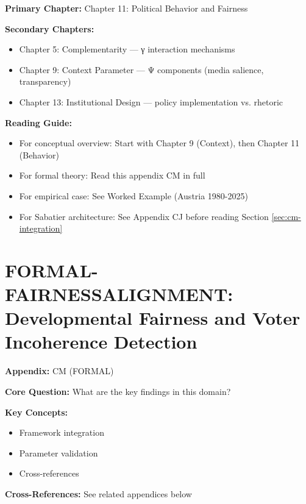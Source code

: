 \begin{tcolorbox}[colback=purple!5!white, colframe=purple!75!black,
    title=Chapter Linkage]

\textbf{Primary Chapter:} Chapter 11: Political Behavior and Fairness

\textbf{Secondary Chapters:}
\begin{itemize}[nosep]
\item Chapter 5: Complementarity --- γ interaction mechanisms
\item Chapter 9: Context Parameter --- Ψ components (media salience, transparency)
\item Chapter 13: Institutional Design --- policy implementation vs. rhetoric
\end{itemize}

\textbf{Reading Guide:}
\begin{itemize}[nosep]
\item For conceptual overview: Start with Chapter 9 (Context), then Chapter 11 (Behavior)
\item For formal theory: Read this appendix CM in full
\item For empirical case: See Worked Example (Austria 1980-2025)
\item For Sabatier architecture: See Appendix CJ before reading Section \ref{sec:cm-integration}
\end{itemize}

\end{tcolorbox}

\chapter{FORMAL-FAIRNESSALIGNMENT: Developmental Fairness and Voter Incoherence Detection}
\label{app:fairness-alignment}

\begin{tcolorbox}[colback=blue!5!white, colframe=blue!75!black,
    title=Quick Reference: Appendix CM]

\textbf{Appendix:} CM (FORMAL)

\textbf{Core Question:} What are the key findings in this domain?

\textbf{Key Concepts:}
\begin{itemize}[nosep]
\item Framework integration
\item Parameter validation
\item Cross-references
\end{itemize}

\textbf{Cross-References:} See related appendices below
\end{tcolorbox}

